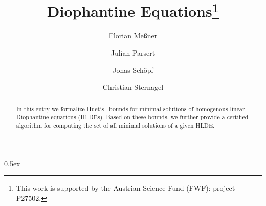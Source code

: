 \documentclass[11pt,a4paper]{article}
\begin{document}
\title{Diophantine Equations\thanks{%
  This work is supported by the Austrian Science Fund (FWF): project P27502.}}
\author{%
  Florian Meßner \and
  Julian Parsert \and
  Jonas Schöpf \and
  Christian Sternagel}
\maketitle

\begin{abstract}
In this entry we formalize Huet's~\cite{Huet1978} bounds for minimal solutions
of homogenous linear Diophantine equations (HLDEs). Based on these bounds, we
further provide a certified algorithm for computing the set of all minimal
solutions of a given HLDE.
\end{abstract}

\tableofcontents


\parindent 0pt\parskip 0.5ex





\end{document}
